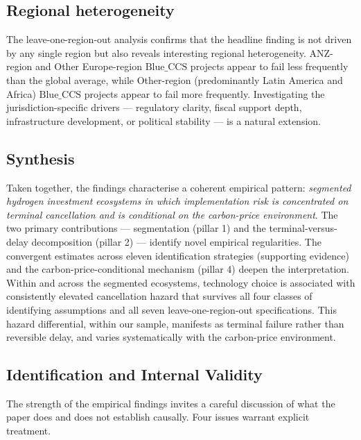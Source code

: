\documentclass[review,authoryear,11pt]{elsarticle}
\newcommand{\BlueCCS}{\mathrm{Blue\_CCS}}
\begin{document}
\subsection{Regional heterogeneity}

The leave-one-region-out analysis confirms that the headline finding is not driven by any single region but also reveals interesting regional heterogeneity. ANZ-region and Other Europe-region $\BlueCCS$ projects appear to fail less frequently than the global average, while Other-region (predominantly Latin America and Africa) $\BlueCCS$ projects appear to fail more frequently. Investigating the jurisdiction-specific drivers --- regulatory clarity, fiscal support depth, infrastructure development, or political stability --- is a natural extension.

\subsection{Synthesis}

Taken together, the findings characterise a coherent empirical pattern: \emph{segmented hydrogen investment ecosystems in which implementation risk is concentrated on terminal cancellation and is conditional on the carbon-price environment}. The two primary contributions --- segmentation (pillar 1) and the terminal-versus-delay decomposition (pillar 2) --- identify novel empirical regularities. The convergent estimates across eleven identification strategies (supporting evidence) and the carbon-price-conditional mechanism (pillar 4) deepen the interpretation. Within and across the segmented ecosystems, technology choice is associated with consistently elevated cancellation hazard that survives all four classes of identifying assumptions and all seven leave-one-region-out specifications. This hazard differential, within our sample, manifests as terminal failure rather than reversible delay, and varies systematically with the carbon-price environment.

\subsection{Identification and Internal Validity}
\label{sec:identification}

The strength of the empirical findings invites a careful discussion of what the paper does and does not establish causally. Four issues warrant explicit treatment.
\end{document}
